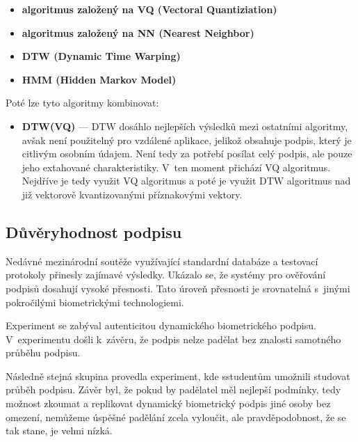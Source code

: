 \begin{itemize}
  \item \textbf{algoritmus založený na VQ (Vectoral Quantiziation)}
  \item \textbf{algoritmus založený na NN (Nearest Neighbor)}
  \item \textbf{DTW (Dynamic Time Warping)}
  \item \textbf{HMM (Hidden Markov Model)}
\end{itemize}
\noindent
Poté lze tyto algoritmy kombinovat:
\begin{itemize}
  \item \textbf{DTW(VQ)} --- DTW dosáhlo nejlepších výsledků mezi ostatními algoritmy, avšak není použitelný pro vzdálené aplikace, jelikož obsahuje podpis, který je citlivým osobním údajem.
  Není tedy za potřebí posílat celý podpis, ale pouze jeho extahované charakteristiky.
  V~ten moment přichází VQ algoritmus. Nejdříve je tedy využit VQ algoritmus a poté je využit DTW algoritmus nad již vektorově kvantizovanými příznakovými vektory.~\cite{Jain2006}
\end{itemize}

\subsection*{Důvěryhodnost podpisu}
Nedávné mezinárodní soutěže využívající standardní databáze a testovací protokoly přinesly zajímavé výsledky.   %
Ukázalo se, že systémy pro ověřování podpisů dosahují vysoké přesnosti.                                         %
Tato úroveň přesnosti je srovnatelná s~jinými pokročilými biometrickými technologiemi.~\cite{Impedovo2008}      %

Experiment se zabýval autenticitou dynamického biometrického podpisu.
V~experimentu došli k~závěru, že podpis nelze padělat bez znalosti samotného průběhu podpisu.~\cite{6986974} %

Následně stejná skupina provedla experiment, kde sstudentům umožnili studovat průběh podpisu.
Závěr byl, že pokud by padělatel měl nejlepší podmínky, tedy možnost zkoumat a replikovat dynamický biometrický podpis jiné osoby bez omezení, 
nemůžeme úspěšné padělání zcela vyloučit, ale pravděpodobnost, že se tak stane, je velmi nízká.~\cite{8585636} %


